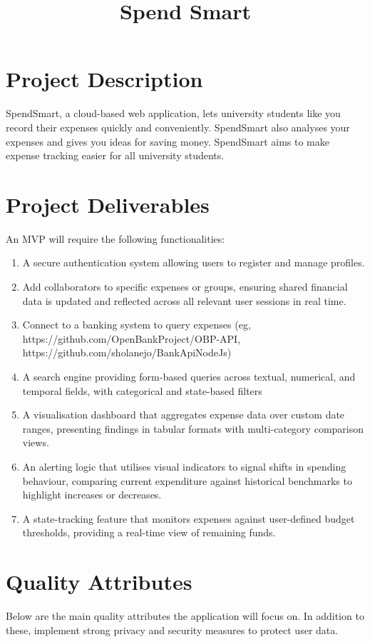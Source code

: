 \title{Spend Smart}

\maketitle
\section*{Project Description}

SpendSmart, a cloud-based web application, lets university students like you record their expenses quickly and conveniently. 
SpendSmart also analyses your expenses and gives you ideas for saving money. 
SpendSmart aims to make expense tracking easier for all university students.

\section*{Project Deliverables}
An MVP will require the following functionalities:
\begin{enumerate}
\item A secure authentication system allowing users to register and manage profiles.
\item Add collaborators to specific expenses or groups, ensuring shared financial data is updated and reflected across all relevant user sessions in real time.
\item Connect to a banking system to query expenses (eg, https://github.com/OpenBankProject/OBP-API, https://github.com/sholanejo/BankApiNodeJs)
\item A search engine providing form-based queries across textual, numerical, and temporal fields, with categorical and state-based filters
\item A visualisation dashboard that aggregates expense data over custom date ranges, presenting findings in tabular formats with multi-category comparison views.
\item An alerting logic that utilises visual indicators to signal shifts in spending behaviour, comparing current expenditure against historical benchmarks to highlight increases or decreases.
\item A state-tracking feature that monitors expenses against user-defined budget thresholds, providing a real-time view of remaining funds.
\end{enumerate}

\section*{Quality Attributes}
Below are the main quality attributes the application will focus on. 
In addition to these, implement strong privacy and security measures to protect user data.

